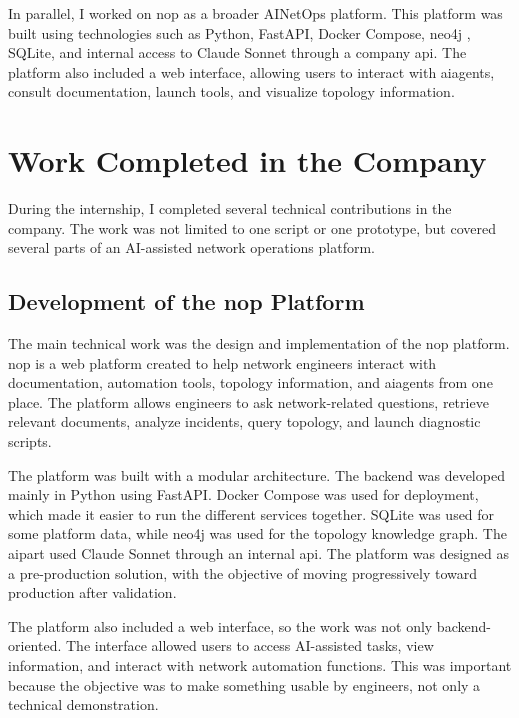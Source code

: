 \documentclass[11pt,a4paper]{report}
\begin{document}
In parallel, I worked on  \gls{nop}  as a broader \gls{AINetOps} platform. This platform was built using technologies such as Python, FastAPI, Docker Compose,  \gls{neo4j} , SQLite, and internal access to Claude Sonnet through a company \gls{api}. The platform also included a web interface, allowing users to interact with \gls{ai}agents, consult documentation, launch tools, and visualize topology information.



\section{Work Completed in the Company}

During the internship, I completed several technical contributions in the company. The work was not limited to one script or one prototype, but covered several parts of an AI-assisted network operations platform.

\subsection{Development of the  \gls{nop}  Platform}

The main technical work was the design and implementation of the  \gls{nop}  platform.  \gls{nop}  is a web platform created to help network engineers interact with documentation, automation tools, topology information, and \gls{ai}agents from one place. The platform allows engineers to ask network-related questions, retrieve relevant documents, analyze incidents, query \gls{topology}, and launch diagnostic scripts.

The platform was built with a modular architecture. The backend was developed mainly in Python using FastAPI. Docker Compose was used for deployment, which made it easier to run the different services together. SQLite was used for some platform data, while  \gls{neo4j}  was used for the topology knowledge graph. The \gls{ai}part used Claude Sonnet through an internal \gls{api}. The platform was designed as a pre-production solution, with the objective of moving progressively toward production after validation.

The platform also included a web interface, so the work was not only backend-oriented. The interface allowed users to access AI-assisted tasks, view information, and interact with network automation functions. This was important because the objective was to make something usable by engineers, not only a technical demonstration.
\end{document}
